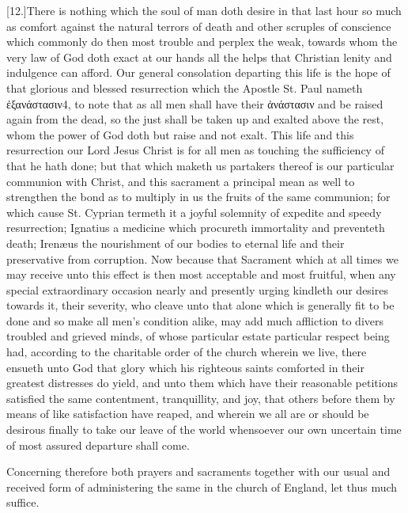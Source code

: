 [12.]There is nothing which the soul of man doth desire in that last hour so much as comfort against the natural terrors of death and other scruples of conscience which commonly do then most trouble and perplex the weak, towards whom the very law of God doth exact at our hands all the helps that Christian lenity and indulgence can afford. Our general consolation departing this life is the hope of that glorious and blessed resurrection which the Apostle St. Paul nameth ἐξανάστασιν4, to note that as all men shall  have their ἀνάστασιν and be raised again from the dead, so the just shall be taken up and exalted above the rest, whom the power of God doth but raise and not exalt. This life and this resurrection our Lord Jesus Christ is for all men as touching the sufficiency of that he hath done; but that which maketh us partakers thereof is our particular communion with Christ, and this sacrament a principal mean as well to strengthen the bond as to multiply in us the fruits of the same communion; for which cause St. Cyprian termeth it a joyful solemnity of expedite and speedy resurrection; Ignatius a medicine which procureth immortality and preventeth death; Irenæus the nourishment of our bodies to eternal life and their preservative from corruption. Now because that Sacrament which at all times we may receive unto this effect is then most acceptable and most fruitful, when any special extraordinary occasion nearly and presently urging kindleth our desires towards it, their severity, who cleave unto that alone which is generally fit to be done and so make all men’s condition alike, may add much affliction to divers troubled and grieved minds, of whose particular estate particular respect being had, according to the charitable order of the church wherein we live, there ensueth unto God that glory which his righteous saints comforted in their greatest distresses do yield, and unto them which have their reasonable petitions satisfied the same contentment, tranquillity, and joy, that others before them by means of like satisfaction have reaped, and wherein we all are or should be desirous finally to take our leave of the world whensoever our own uncertain time of most assured departure shall come.

Concerning therefore both prayers and sacraments together with our usual and received form of administering the same in the church of England, let thus much suffice.




